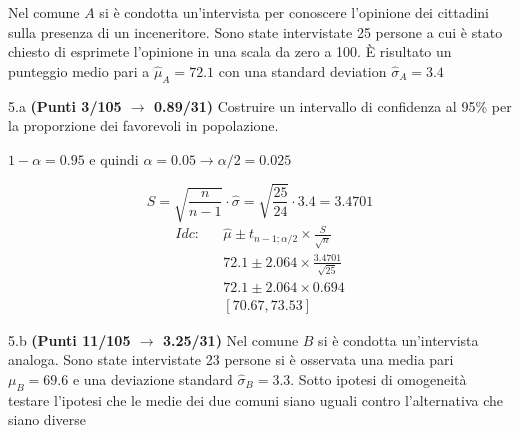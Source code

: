 \documentclass[
  11pt,
]{book}
\theoremstyle{mytheoremstyle}
\theoremstyle{mydefstyle}
\newenvironment{sol}
  {
  \begin{tcolorbox}[enhanced,breakable,arc=0.1mm,boxrule=1pt,colback=white,colframe=iblue,
  title=\bf \fontfamily{lmss}\selectfont \hspace{.5 cm} Soluzione,drop fuzzy shadow]

}{
\end{tcolorbox}
  }
\begin{document}
Nel comune \(A\) si è condotta un'intervista per conoscere l'opinione
dei cittadini sulla presenza di un inceneritore. Sono state intervistate
25 persone a cui è stato chiesto di esprimete l'opinione in una scala da zero a 100.
È risultato un punteggio medio pari a \(\hat\mu_A=72.1\) con una standard deviation
\(\hat\sigma_A=3.4\)

5.a \textbf{(Punti 3/105 \(\rightarrow\) 0.89/31)} Costruire un intervallo di confidenza al 95\%
per la proporzione dei favorevoli in popolazione.

\begin{sol}
\(1-\alpha =0.95\) e quindi \(\alpha=0.05\rightarrow \alpha/2=0.025\)

\[
      S  =\sqrt{\frac {n}{n-1}}\cdot\hat\sigma =
     \sqrt{\frac { 25 }{ 24 }}\cdot 3.4 = 3.4701 
\]
\begin{eqnarray*}
  Idc: & &  \hat\mu \pm  t_{n-1;\alpha/2} \times \frac{S}{\sqrt{n}} \\
     & &  72.1 \pm  2.064 \times \frac{ 3.4701 }{\sqrt{ 25 }} \\
     & &  72.1 \pm  2.064 \times  0.694 \\
     & & [ 70.67 ,  73.53 ]
\end{eqnarray*}

\end{sol}

5.b \textbf{(Punti 11/105 \(\rightarrow\) 3.25/31)} Nel comune \(B\) si è condotta un'intervista analoga.
Sono state intervistate 23 persone si è osservata una media pari \(\mu_B=69.6\) e una deviazione standard \(\hat\sigma_B=3.3\).
Sotto ipotesi di omogeneità testare l'ipotesi che le medie dei due comuni siano uguali contro l'alternativa che siano diverse
\end{document}
